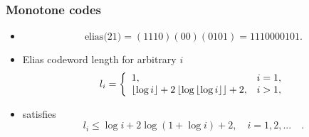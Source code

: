\documentclass[14pt]{beamer}
\begin{document}
\begin{frame}
\frametitle{Monotone codes}
\begin{itemize}    
    
    \item 
    \[
    \mbox{elias(21)} = (1110)(00)(0101)=1110000101.
    \]
    
    \item Elias codeword length for arbitrary $i$
    \begin{equation}
    \label{eq4_4} l_i = \left\{ %
    \begin{array}{l l}
     1, & i = 1, \\
     \left\lfloor {\log i} \right\rfloor + 2\left\lfloor {\log \left\lfloor
    {\log i} \right\rfloor } \right\rfloor + 2, &i > 1, \\
    \end{array}  \right.
    \end{equation}
    
    \item satisfies
    \begin{equation}
    \label{eq4_5} l_i \le \log i + 2\log (1 + \log i) + 2, \quad i = 1,2,... \quad .
    \end{equation}


\end{itemize}
\end{frame}
\end{document}
